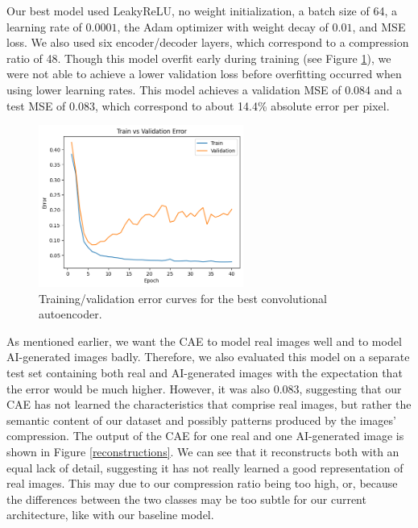 \documentclass{article} %
\begin{document}
Our best model used LeakyReLU, no weight initialization, a batch size of 64, a learning rate of $0.0001$, the Adam optimizer with weight decay of $0.01$, and MSE loss. We also used six encoder/decoder layers, which correspond to a compression ratio of 48. Though this model overfit early during training (see Figure \ref{cae_curves}), we were not able to achieve a lower validation loss before overfitting occurred when using lower learning rates. This model achieves a validation MSE of 0.084 and a test MSE of 0.083, which correspond to about 14.4\% absolute error per pixel.

\begin{figure}[h]
    \label{cae_curves}
    \begin{center}
        \includegraphics[width=0.6\textwidth]{figs/cae_error_curves.png}
    \end{center}
    \caption{Training/validation error curves for the best convolutional autoencoder.}
\end{figure}

As mentioned earlier, we want the CAE to model real images well and to model AI-generated images badly. Therefore, we also evaluated this model on a separate test set containing both real and AI-generated images with the expectation that the error would be much higher. However, it was also $0.083$, suggesting that our CAE has not learned the characteristics that comprise real images, but rather the semantic content of our dataset and possibly patterns produced by the images' compression. The output of the CAE for one real and one AI-generated image is shown in Figure \ref{reconstructions}. We can see that it reconstructs both with an equal lack of detail, suggesting it has not really learned a good representation of real images. This may due to our compression ratio being too high, or, because the differences between the two classes may be too subtle for our current architecture, like with our baseline model.
\end{document}
